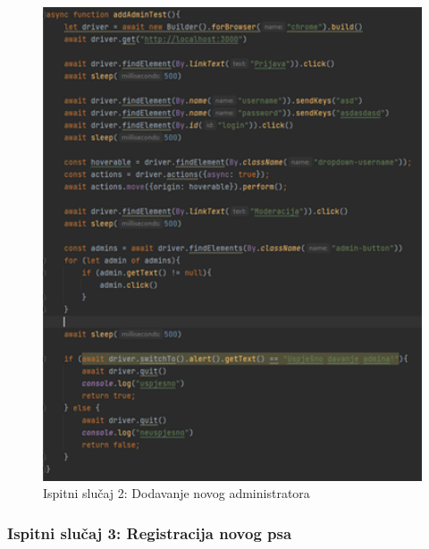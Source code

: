 		 	\begin{figure}[H]
		 		\centering
		 		\includegraphics[width=12cm]{slike/dodavanjeAdmina}
		 		\caption{Ispitni slučaj 2: Dodavanje novog administratora}
		 		\label{fig:Ispitni-slucaj-2}
		 	\end{figure}
	 	
	 		\subsubsection{Ispitni slučaj 3: Registracija novog psa}
	 		
